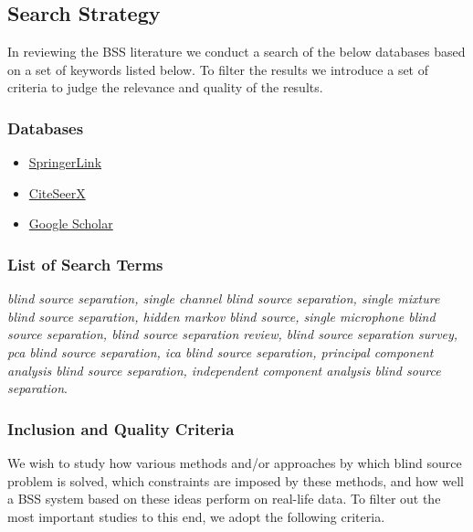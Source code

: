 \subsection{Search Strategy}
In reviewing the BSS literature we conduct a search of the below databases based on a set of keywords listed below. To filter the results we introduce a set of criteria to judge the relevance and quality of the results.

\subsubsection{Databases}

\begin{itemize}
 \item \href{www.springerlink.com}{SpringerLink}
 \item \href {www.citeseerx}{CiteSeerX}
 \item \href{scholar.google.com}{Google Scholar}
\end{itemize}

\subsubsection{List of Search Terms}

\emph{blind source separation, single channel blind source separation, single mixture blind source separation, hidden markov blind source, single microphone blind source separation, blind source separation review, blind source separation survey, pca blind source separation, ica blind source separation, principal component analysis blind source separation, independent component analysis blind source separation}.



\subsubsection{Inclusion and Quality Criteria}
We wish to study how various methods and/or approaches by which blind source problem is solved, which constraints are imposed by these methods, and how well a BSS system based on these ideas perform on real-life data. To filter out the most important studies to this end, we adopt the following criteria.

